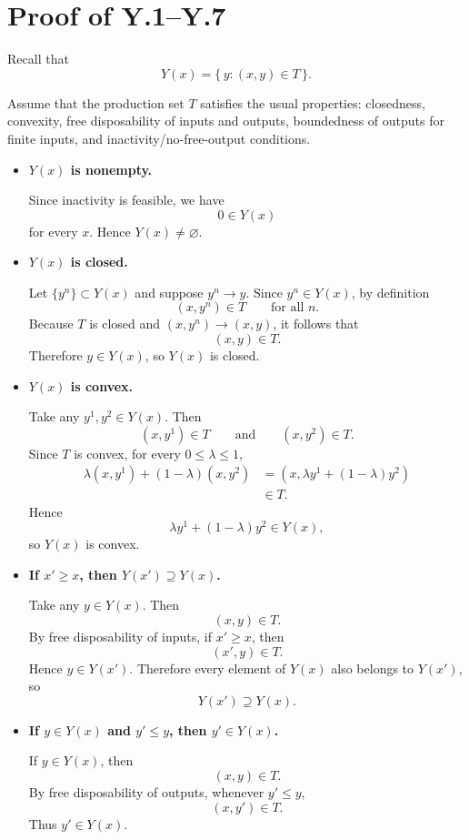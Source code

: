 \section*{Proof of Y.1--Y.7}

Recall that
\[
Y(x)=\{\,y:(x,y)\in T\,\}.
\]

Assume that the production set \(T\) satisfies the usual properties:
closedness, convexity, free disposability of inputs and outputs, boundedness of outputs for finite inputs, and inactivity/no-free-output conditions.

\begin{itemize}
\item[(Y.1)] \textbf{\(Y(x)\) is nonempty.}

Since inactivity is feasible, we have
\[
0 \in Y(x)
\]
for every \(x\). Hence \(Y(x)\neq \varnothing\).

\item[(Y.2)] \textbf{\(Y(x)\) is closed.}

Let \(\{y^n\}\subset Y(x)\) and suppose \(y^n \to y\).  
Since \(y^n\in Y(x)\), by definition
\[
(x,y^n)\in T \qquad \text{for all } n.
\]
Because \(T\) is closed and \((x,y^n)\to (x,y)\), it follows that
\[
(x,y)\in T.
\]
Therefore \(y\in Y(x)\), so \(Y(x)\) is closed.

\item[(Y.3)] \textbf{\(Y(x)\) is convex.}

Take any \(y^1,y^2\in Y(x)\). Then
\[
(x,y^1)\in T
\qquad \text{and} \qquad
(x,y^2)\in T.
\]
Since \(T\) is convex, for every \(0\le \lambda \le 1\),
\[
\begin{aligned}
\lambda (x,y^1)+(1-\lambda)(x,y^2)
&=
(x,\lambda y^1+(1-\lambda)y^2)\\
&\in T.
\end{aligned}
\]
Hence
\[
\lambda y^1+(1-\lambda)y^2\in Y(x),
\]
so \(Y(x)\) is convex.

\item[(Y.4)] \textbf{If \(x'\ge x\), then \(Y(x')\supseteq Y(x)\).}

Take any \(y\in Y(x)\). Then
\[
(x,y)\in T.
\]
By free disposability of inputs, if \(x'\ge x\), then
\[
(x',y)\in T.
\]
Hence \(y\in Y(x')\). Therefore every element of \(Y(x)\) also belongs to \(Y(x')\), so
\[
Y(x')\supseteq Y(x).
\]

\item[(Y.5)] \textbf{If \(y\in Y(x)\) and \(y'\le y\), then \(y'\in Y(x)\).}

If \(y\in Y(x)\), then
\[
(x,y)\in T.
\]
By free disposability of outputs, whenever \(y'\le y\),
\[
(x,y')\in T.
\]
Thus \(y'\in Y(x)\).


\end{itemize}
